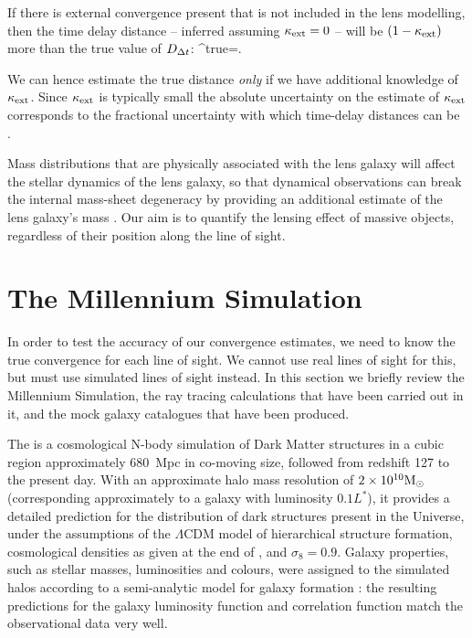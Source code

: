 \documentclass[useAMS,usenatbib,a4paper]{mn2e}
\begin{document}
If there is external convergence present that is not included in the
lens modelling, then the time delay distance -- inferred assuming $\kappa_{\rm ext}
= 0$ -- will be $(1-\kappa_{\rm ext})$ more than the true value of $D_{\Delta t}$:
\be 
\label{eq:MassSheet:Dtbias}
\Dt^{\rm{true}}=.
\ee

We can hence estimate the true distance {\it only} if we have additional
knowledge of $\kappa_{\rm ext}$. Since $\kappa_{\rm ext}$ is typically small the absolute
uncertainty on the estimate of $\kappa_{\rm ext}$ corresponds to the fractional
uncertainty with which time-delay distances can be \infered.

Mass distributions that are physically associated with the lens galaxy will
affect the stellar dynamics of the lens galaxy, so that dynamical observations
can break the internal mass-sheet degeneracy by providing an additional
estimate of the lens galaxy's mass
\citep[e.g.,][]{Koopmans2004,SuyuEtal2010}.  Our aim is to quantify the
lensing effect of massive objects, regardless of their position along the line
of sight.  


\section{The Millennium Simulation}
\label{sec:MS}

In order to test the accuracy of our convergence estimates, we need to
know the true convergence for each line of sight. We cannot use  real
lines of sight for this,  but must use simulated lines of sight instead.
In this section we briefly review the Millennium Simulation, the ray
tracing calculations that have been carried out in it, and the mock
galaxy catalogues that have been produced.

The \MS \citep{SpringelEtal2005} is a cosmological N-body simulation of
Dark Matter structures in a cubic region approximately 680~Mpc in
co-moving size, followed from redshift 127 to the present day. With an
approximate halo mass resolution of $2\times10^{10}{\rm M}_{\odot}$
(corresponding approximately to a galaxy with luminosity $0.1L^{*}$), it
provides a detailed prediction for the distribution of dark structures
present in the Universe, under the assumptions of the $\Lambda$CDM model
of hierarchical structure formation, cosmological densities as given at
the end of , and $\sigma_8 = 0.9$.
Galaxy properties,
such as stellar masses, luminosities and colours, were assigned to the
simulated halos according to a semi-analytic model for galaxy formation
\citep{DeLucia+Blaizot2007}: the resulting predictions for the galaxy
luminosity function and correlation function match the observational
data very well.
\end{document}
